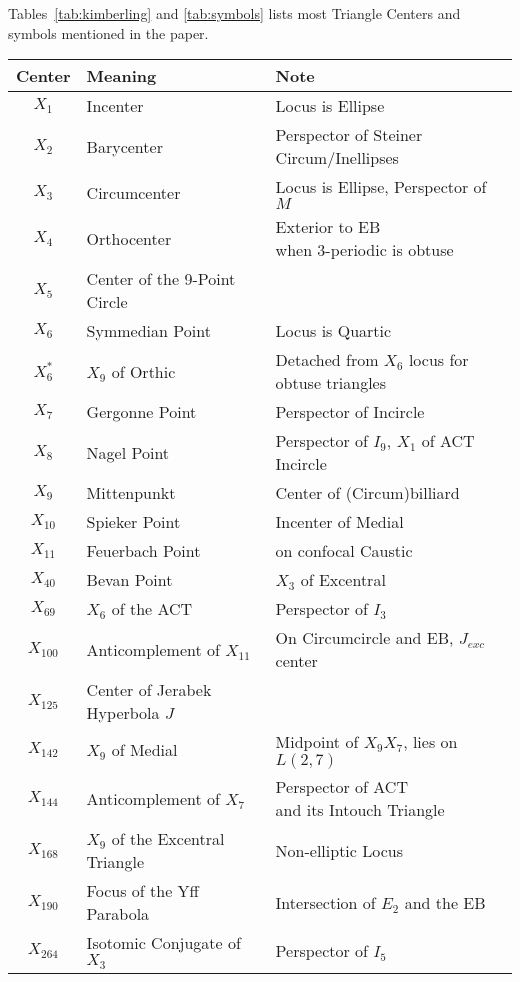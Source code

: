 Tables~\ref{tab:kimberling} and \ref{tab:symbols} lists most Triangle Centers and symbols mentioned in the paper.

\begin{table}
\scriptsize
\begin{tabular}{|c|l|l|}
\hline
Center & Meaning & Note\\
\hline
$X_1$ & Incenter & Locus is Ellipse \\
$X_2$ & Barycenter & Perspector of Steiner Circum/Inellipses \\
$X_3$ & Circumcenter & Locus is Ellipse, Perspector of $M$ \\
$X_4$ & Orthocenter & \makecell[tl]{Exterior to EB\\ when 3-periodic is obtuse} \\
$X_5$ & Center of the 9-Point Circle & \\
$X_6$ & Symmedian Point & Locus is Quartic \cite{garcia2020-ellipses} \\
$X_6^*$ & $X_9$ of Orthic & Detached from $X_6$ locus for obtuse triangles \\
$X_7$ & Gergonne Point & Perspector of Incircle \\
$X_8$ & Nagel Point & Perspector of $I_9$, $X_1$ of ACT Incircle \\
$X_9$ & Mittenpunkt & Center of (Circum)billiard \\
$X_{10}$ & Spieker Point & Incenter of Medial \\
$X_{11}$ & Feuerbach Point & on confocal Caustic \\
$X_{40}$ & Bevan Point & $X_3$ of Excentral \\
$X_{69}$ & $X_6$ of the ACT & Perspector of $I_3$ \\
$X_{100}$ & Anticomplement of $X_{11}$ & On Circumcircle and EB, $J_{exc}$ center \\
$X_{125}$ & Center of Jerabek Hyperbola $J$ & \\
$X_{142}$ & $X_9$ of Medial & Midpoint of $X_9{X_{7}}$, lies on $L(2,7)$ \\ 
$X_{144}$ & Anticomplement of $X_7$ &\makecell[tl]{Perspector of ACT\\and its Intouch Triangle} \\
$X_{168}$ & $X_9$ of the Excentral Triangle &  Non-elliptic Locus\\
$X_{190}$ & Focus of the Yff Parabola & Intersection of $E_2$ and the EB \\
$X_{264}$ & Isotomic Conjugate of $X_3$ & Perspector of $I_5$ \\

\end{tabular}
\end{table}
